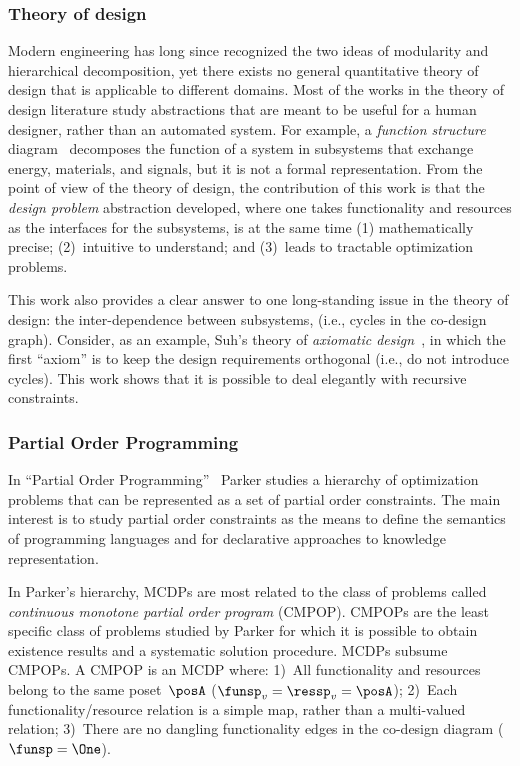 \subsubsection{Theory of design}

Modern engineering has long since recognized the two ideas of modularity
and hierarchical decomposition, yet there exists no general quantitative
theory of design that is applicable to different domains. Most of
the works in the theory of design literature study abstractions that
are meant to be useful for a human designer, rather than an automated
system. For example, a \emph{function structure }diagram~\cite[p. 32]{pahl07}
decomposes the function of a system in subsystems that exchange energy,
materials, and signals, but it is not a formal representation. From
the point of view of the theory of design, the contribution of this
work is that the \emph{design problem }abstraction developed, where
one takes functionality and resources as the interfaces for the subsystems,
is at the same time (1) mathematically precise; (2)~intuitive to
understand; and (3)~leads to tractable optimization problems.

This work also provides a clear answer to one long-standing issue
in the theory of design: the inter-dependence between subsystems,
(i.e., cycles in the co-design graph). Consider, as an example, Suh's
theory of \emph{axiomatic design~}\cite{suh01}, in which the first
``axiom'' is to keep the design requirements orthogonal (i.e., do
not introduce cycles). This work shows that it is possible to deal
elegantly with recursive constraints.


\subsubsection{Partial Order Programming}

In ``Partial Order Programming''~\cite{parkerjr89partial} Parker
studies a hierarchy of optimization problems that can be represented
as a set of partial order constraints. The main interest is to study
partial order constraints as the means to define the semantics of
programming languages and for declarative approaches to knowledge
representation.

In Parker's hierarchy, MCDPs are most related to the class of problems
called \emph{continuous monotone partial order program} (CMPOP). CMPOPs
are the least specific class of problems studied by Parker for which
it is possible to obtain existence results and a systematic solution
procedure. MCDPs subsume CMPOPs. A CMPOP is an MCDP where: 1)~All
functionality and resources belong to the same poset~$\posA$ ($\funsp_{v}=\ressp_{v}=\posA$);
2)~Each functionality/resource relation is a simple map, rather than
a multi-valued relation; 3)~There are no dangling functionality edges
in the co-design diagram ($\funsp=\One$).

